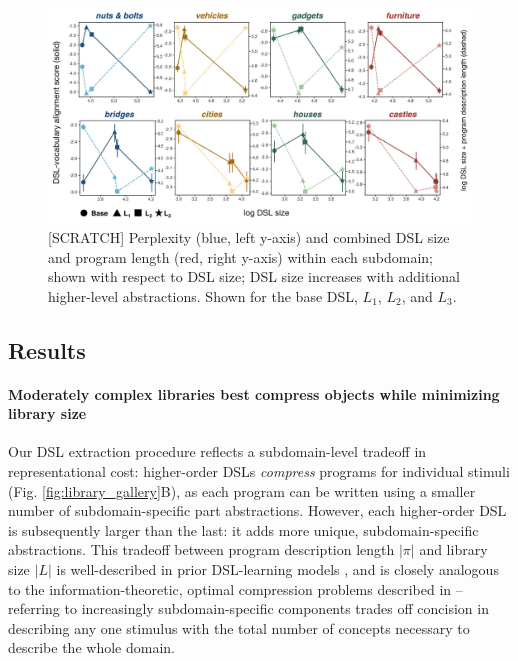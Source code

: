 \documentclass[10pt,letterpaper]{article}
\begin{document}
\begin{figure}[ht!]
  \begin{center}
  \includegraphics[width=0.9\linewidth]{figures/lax_library_costs.pdf}
  \caption{[SCRATCH] 
  Perplexity (blue, left y-axis) and combined DSL size and program length (red, right y-axis) within each subdomain; shown with respect to DSL size; DSL size increases with additional higher-level abstractions. Shown for the base DSL, $L_1$, $L_2$, and $L_3$.}\label{fig:perplexity-length}
  \end{center}
\end{figure}

\subsection{Results}
\paragraph{Moderately complex libraries best compress objects while minimizing library size} 
Our DSL extraction procedure reflects a subdomain-level tradeoff in representational cost: higher-order DSLs \textit{compress} programs for individual stimuli (Fig. \ref{fig:library_gallery}B), as each program can be written using a smaller number of subdomain-specific part abstractions. However, each higher-order DSL is subsequently larger than the last: it adds more unique, subdomain-specific abstractions.
This tradeoff between program description length $|\pi|$ and library size $|L|$ is well-described in prior DSL-learning models , and is closely analogous to the information-theoretic, optimal compression problems described in  -- referring to increasingly subdomain-specific components trades off concision in describing any one stimulus with the total number of concepts necessary to describe the whole domain. 
\end{document}
